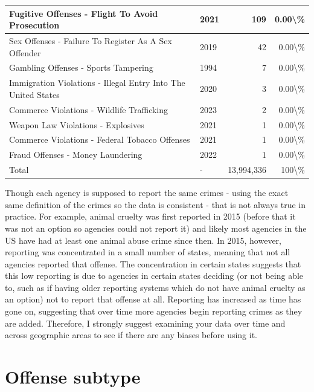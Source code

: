 \documentclass[
]{krantz}
\begin{document}
\begin{longtable}[t]{l|l|r|r}
\hline
Fugitive Offenses - Flight To Avoid Prosecution & 2021 & 109 & 0.00\textbackslash{}\%\\
\hline
Sex Offenses - Failure To Register As A Sex Offender & 2019 & 42 & 0.00\textbackslash{}\%\\
\hline
Gambling Offenses - Sports Tampering & 1994 & 7 & 0.00\textbackslash{}\%\\
\hline
Immigration Violations - Illegal Entry Into The United States & 2020 & 3 & 0.00\textbackslash{}\%\\
\hline
Commerce Violations - Wildlife Trafficking & 2023 & 2 & 0.00\textbackslash{}\%\\
\hline
Weapon Law Violations - Explosives & 2021 & 1 & 0.00\textbackslash{}\%\\
\hline
Commerce Violations - Federal Tobacco Offenses & 2021 & 1 & 0.00\textbackslash{}\%\\
\hline
Fraud Offenses - Money Laundering & 2022 & 1 & 0.00\textbackslash{}\%\\
\hline
Total & - & 13,994,336 & 100\textbackslash{}\%\\
\hline
\end{longtable}

Though each agency is supposed to report the same crimes -
using the exact same definition of the crimes so the data is
consistent - that is not always true in practice. For
example, animal cruelty was first reported in 2015 (before
that it was not an option so agencies could not report it)
and likely most agencies in the US have had at least one
animal abuse crime since then. In 2015, however, reporting
was concentrated in a small number of states, meaning that
not all agencies reported that offense. The concentration in
certain states suggests that this low reporting is due to
agencies in certain states deciding (or not being able to,
such as if having older reporting systems which do not have
animal cruelty as an option) not to report that offense at
all. Reporting has increased as time has gone on, suggesting
that over time more agencies begin reporting crimes as they
are added. Therefore, I strongly suggest examining your data
over time and across geographic areas to see if there are
any biases before using it.

\section{Offense subtype}\label{offense-subtype}
\end{document}
